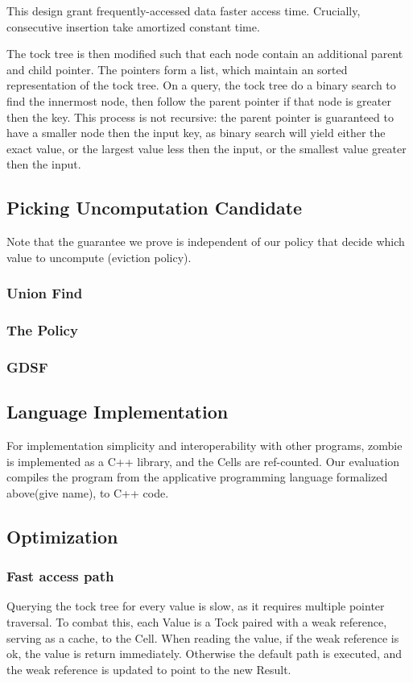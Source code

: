 \documentclass[acmsmall]{acmart}
\begin{document}
	This design grant frequently-accessed data faster access time. Crucially, consecutive insertion take amortized constant time.
	
	The tock tree is then modified such that each node contain an additional parent and child pointer. The pointers form a list, which maintain an sorted representation of the tock tree. On a query, the tock tree do a binary search to find the innermost node, then follow the parent pointer if that node is greater then the key. This process is not recursive: the parent pointer is guaranteed to have a smaller node then the input key, as binary search will yield either the exact value, or the largest value less then the input, or the smallest value greater then the input.
	\subsection{Picking Uncomputation Candidate}
	Note that the guarantee we prove is independent of our policy that decide which value to uncompute (eviction policy).
	\subsubsection{Union Find}
	\subsubsection{The Policy}
	\subsubsection{GDSF}
	\subsection{Language Implementation}
	For implementation simplicity and interoperability with other programs, zombie is implemented as a C++ library, and the Cells are ref-counted. Our evaluation compiles the program from the applicative programming language formalized above(give name), to C++ code.
	\subsection{Optimization}
	\subsubsection{Fast access path}
	Querying the tock tree for every value is slow, as it requires multiple pointer traversal.
	To combat this, each Value is a Tock paired with a weak reference, serving as a cache, to the Cell. When reading the value, if the weak reference is ok, the value is return immediately. Otherwise the default path is executed, and the weak reference is updated to point to the new Result.
\end{document}
